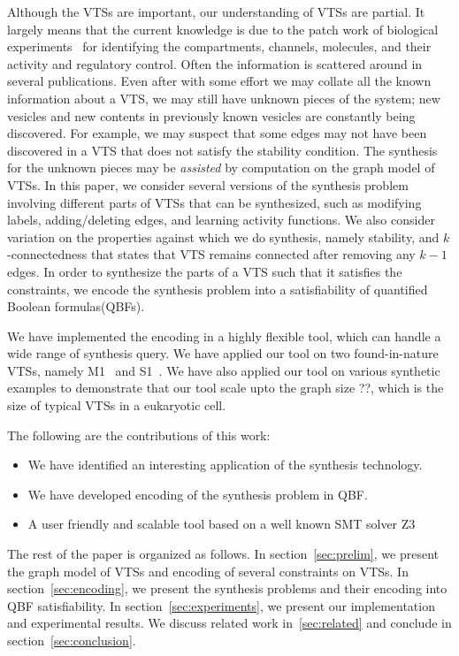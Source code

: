 %
Although the VTSs are important, our understanding of VTSs are partial.
%
It largely means that the current knowledge is due to the patch work
of biological experiments~\cite{model} for identifying the compartments,
channels, molecules, and their activity and regulatory control.
%
Often the information is scattered around in several publications.
%
Even after with some effort we may collate all the known information about
a VTS, we may still have unknown pieces of the system; new vesicles and new contents in previously known vesicles are constantly being discovered.
%
%
For example, we may suspect that some edges may not have been
discovered in a VTS that does not satisfy the stability condition.
%
The synthesis for the unknown pieces may be {\em assisted} by computation on
the graph model of VTSs.
%
In this paper, we consider several versions of the synthesis problem
involving different parts of VTSs that can be synthesized, such as
modifying labels, adding/deleting edges, and learning activity functions.
%
We also consider variation on the properties against which we do synthesis,
namely stability, and $k$-connectedness that states
that VTS remains connected after removing any $k-1$ edges.
%
In order to synthesize the parts of a VTS such that it satisfies the
constraints, we encode the synthesis problem into a satisfiability of
quantified Boolean formulas(QBFs). 
%

We have implemented the encoding in a highly flexible tool,
which can handle a wide range of synthesis query.
%
We have applied our tool on two found-in-nature VTSs, namely
M1~\cite{} and S1~\cite{}.
%
We have also applied our tool on various synthetic examples to
demonstrate that our tool scale upto the graph size ??, which
is the size of typical VTSs in a eukaryotic cell.

The following are the contributions of this work:
\begin{itemize}
\item We have identified an interesting application of
  the synthesis technology.
\item We have developed encoding of the synthesis problem in QBF.
\item A user friendly and scalable tool based on a well known SMT solver Z3
\end{itemize}

The rest of the paper is organized as follows.
%
In section~\ref{sec:prelim}, we present the graph model of VTSs and encoding of several
constraints on VTSs.
%
In section~\ref{sec:encoding}, we present the synthesis problems and their
encoding into QBF satisfiability.
%
In section~\ref{sec:experiments}, we present our implementation and experimental results.
%
We discuss related work in~\ref{sec:related} and conclude in section~\ref{sec:conclusion}.



